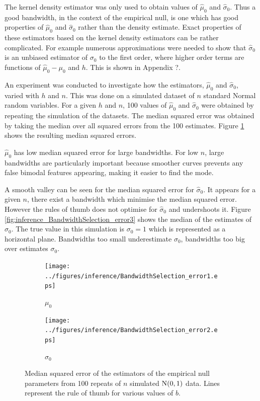 The kernel density estimator was only used to obtain values of $\widehat{\mu}_0$ and $\widehat{\sigma}_0$. Thus a good bandwidth, in the context of the empirical null, is one which has good properties of $\widehat{\mu}_0$ and $\widehat{\sigma}_0$ rather than the density estimate. Exact properties of these estimators based on the kernel density estimators can be rather complicated. For example numerous approximations were needed to show that $\widehat{\sigma}_0$ is an unbiased estimator of $\sigma_0$ to the first order, where higher order terms are functions of $\widehat{\mu}_0 - \mu_0$ and $h$. This is shown in Appendix ?.

An experiment was conducted to investigate how the estimators, $\widehat{\mu}_0$ and $\widehat{\sigma}_0$, varied with $h$ and $n$. This was done on a simulated dataset of $n$ standard Normal random variables. For a given $h$ and $n$, 100 values of $\widehat{\mu}_0$ and $\widehat{\sigma}_0$ were obtained by repeating the simulation of the datasets. The median squared error was obtained by taking the median over all squared errors from the 100 estimates. Figure \ref{fig:inference_BandwidthSelection_error} shows the resulting median squared errors.

$\widehat{\mu}_0$ has low median squared error for large bandwidths. For low $n$, large bandwidths are particularly important because smoother curves prevents any false bimodal features appearing, making it easier to find the mode.

A smooth valley can be seen for the median squared error for $\widehat{\sigma}_0$. It appears for a given $n$, there exist a bandwidth which minimise the median squared error. However the rules of thumb does not optimise for $\widehat{\sigma}_0$ and undershoots it. Figure \ref{fig:inference_BandwidthSelection_error3} shows the median of the estimates of $\sigma_0$. The true value in this simulation is $\sigma_0=1$ which is represented as a horizontal plane. Bandwidths too small underestimate $\sigma_0$, bandwidths too big over estimates $\sigma_0$.

\begin{figure}
  \centering
  \begin{subfigure}[b]{0.49\textwidth}
      \texttt{[image: ../figures/inference/BandwidthSelection\_error1.eps]}
      \caption{$\mu_0$}
  \end{subfigure}
  \begin{subfigure}[b]{0.49\textwidth}
      \texttt{[image: ../figures/inference/BandwidthSelection\_error2.eps]}
      \caption{$\sigma_0$}
  \end{subfigure}
  \caption{Median squared error of the estimators of the empirical null parameters from 100 repeats of $n$ simulated $\operatorname{N}(0,1)$ data. Lines represent the rule of thumb for various values of $b$.}
  \label{fig:inference_BandwidthSelection_error}
\end{figure}

